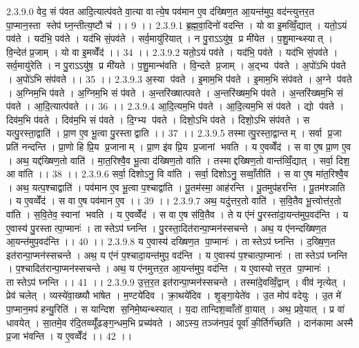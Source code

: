 2.3.9.0
वेद॒ सं प॑वत आदि॒त्यात्प॑वते वा॒त्या वात्ये॒ष पव॑मान ए॒व द॑ख्षिण॒त आ॒यन्त॑मुप॒ वद॑न्त्युत्तर॒त पा॒प्मान॒स्ता स्तेप॑ घ्न॒न्तीत्य॒ष्टौ च॑ ।। 9 ।।
2.3.9.1
ब्र॒ह्म॒वा॒दिनो॑ वदन्ति । यो वा इ॒मव्विँ॒द्यात् । यतो॒ऽयं पव॑ते । यद॑भि॒ पव॑ते । यद॑भि सं॒पव॑ते । सर्व॒मायु॑रियात् । न पु॒राऽऽयु॑ष॒ प्र मी॑येत । प॒शु॒मान्थ्स्यात् । वि॒न्देत॑ प्र॒जाम् । यो वा इ॒मव्वेँद॑ ।। 34 ।।
2.3.9.2
यतो॒ऽयं पव॑ते । यद॑भि॒ पव॑ते । यद॑भि सं॒पव॑ते । सर्व॒मायु॑रेति । न पु॒राऽऽयु॑ष॒ प्र मी॑यते । प॒शु॒मान्भ॑वति । वि॒न्दते प्र॒जाम् । अ॒द्भ्य प॑वते । अ॒पो॑ऽभि प॑वते । अ॒पो॑ऽभि संप॑वते ।। 35 ।।
2.3.9.3
अ॒स्या प॑वते । इ॒माम॒भि प॑वते । इ॒माम॒भि संप॑वते । अ॒ग्ने प॑वते । अ॒ग्निम॒भि प॑वते । अ॒ग्निम॒भि सं प॑वते । अ॒न्तरि॑ख्षात्पवते । अ॒न्तरि॑ख्षम॒भि प॑वते । अ॒न्तरि॑ख्षम॒भि सं प॑वते । आ॒दि॒त्यात्प॑वते ।। 36 ।।
2.3.9.4
आ॒दि॒त्यम॒भि प॑वते । आ॒दि॒त्यम॒भि सं प॑वते । द्यो प॑वते । दिव॑म॒भि प॑वते । दिव॑म॒भि सं प॑वते । दि॒ग्भ्य प॑वते । दिशो॒ऽभि प॑वते । दिशो॒ऽभि संप॑वते । स यत्पु॒रस्ता॒द्वाति॑ । प्रा॒ण ए॒व भू॒त्वा पु॒रस्ताद्वाति ।। 37 ।।
2.3.9.5
तस्मात्पु॒रस्ता॒द्वान्तम् । सर्वा प्र॒जा प्रति॑ नन्दन्ति । प्रा॒णो हि प्रि॒य प्र॒जानाम् । प्रा॒ण इ॑व प्रि॒य प्र॒जानां भवति । य ए॒वव्वेँद॑ । स वा ए॒ष प्रा॒ण ए॒व । अथ॒ यद्द॑ख्षिण॒तो वाति॑ । मा॒त॒रिश्वै॒व भू॒त्वा द॑ख्षिण॒तो वा॑ति । तस्माद्दख्षिण॒तो वान्त॑व्विँ॒द्यात् । सर्वा॒ दिश॒ आ वा॑ति ।। 38 ।।
2.3.9.6
सर्वा॒ दिशोऽनु॒ वि वा॑ति । सर्वा॒ दिशोऽनु॒ सव्वाँ॒तीति॑ । स वा ए॒ष मा॑त॒रिश्वै॒व । अथ॒ यत्प॒श्चाद्वाति॑ । पव॑मान ए॒व भू॒त्वा प॒श्चाद्वा॑ति । पू॒तम॑स्मा॒ आह॑रन्ति । पू॒तमुप॑हरन्ति । पू॒तम॑श्ञाति । य ए॒वव्वेँद॑ । स वा ए॒ष पव॑मान ए॒व ।। 39 ।।
2.3.9.7
अथ॒ यदु॑त्तर॒तो वाति॑ । स॒वि॒तैव भू॒त्त्वोत्त॑र॒तो वा॑ति । स॒वि॒तेव॒ स्वानां भवति । य ए॒वव्वेँद॑ । स वा ए॒ष स॑वि॒तैव । ते य ए॑नं पु॒रस्ता॑दा॒यन्त॑मुप॒वद॑न्ति । य ए॒वास्य॑ पु॒रस्तात्पा॒प्मानः॑ । तास्तेऽप॑ घ्नन्ति । पु॒रस्ता॒दित॑रान्पा॒प्मन॑स्सचन्ते । अथ॒ य ए॑नन्दख्षिण॒त आ॒यन्त॑मुप॒वद॑न्ति ।। 40 ।।
2.3.9.8
य ए॒वास्य॑ दख्षिण॒त पा॒प्मानः॑ । तास्तेऽप॑ घ्नन्ति । द॒ख्षि॒ण॒त इत॑रान्पा॒प्मन॑स्सचन्ते । अथ॒ य ए॑नं प॒श्चादा॒यन्त॑मुप॒ वद॑न्ति । य ए॒वास्य॑ प॒श्चात्पा॒प्मानः॑ । तास्तेऽप॑ घ्नन्ति । प॒श्चादित॑रान्पा॒प्मन॑स्सचन्ते । अथ॒ य ए॑नमुत्तर॒त आ॒यन्त॑मुप॒ वद॑न्ति । य ए॒वास्योत्तर॒त पा॒प्मानः॑ । तास्तेऽप॑ घ्नन्ति ।। 41 ।।
2.3.9.9
उ॒त्त॒र॒त इत॑रान्पा॒प्मन॑स्सचन्ते । तस्मा॑दे॒वव्विँ॒द्वान् । वीव॑ नृत्येत् । प्रेव॑ चलेत् । व्यस्ये॑वा॒ख्ष्यौ भा॑षेत । म॒ण्टये॑दिव । क्रा॒थये॑दिव । शृ॒ङ्गा॒येते॑व । उ॒त मोप॑ वदेयुः । उ॒त मे॑ पा॒प्मान॒मप॑ हन्यु॒रिति॑ । स यान्दिश॑ स॒निमे॒ष्यन्थ्स्यात् । य॒दा तान्दिश॒व्वाँतो॑ वा॒यात् । अथ॒ प्रवे॒यात् । प्र वा॑ धावयेत् । सा॒तमे॒व र॑दि॒तव्व्यूँ॑ढङ्ग॒न्धम॒भि प्रच्य॑वते । आऽस्य॒ तञ्ज॑नप॒दं पूर्वा॑ की॒र्तिर्ग॑च्छति । दान॑कामा अस्मै प्र॒जा भ॑वन्ति । य ए॒वव्वेँद॑ ।। 42 ।।
